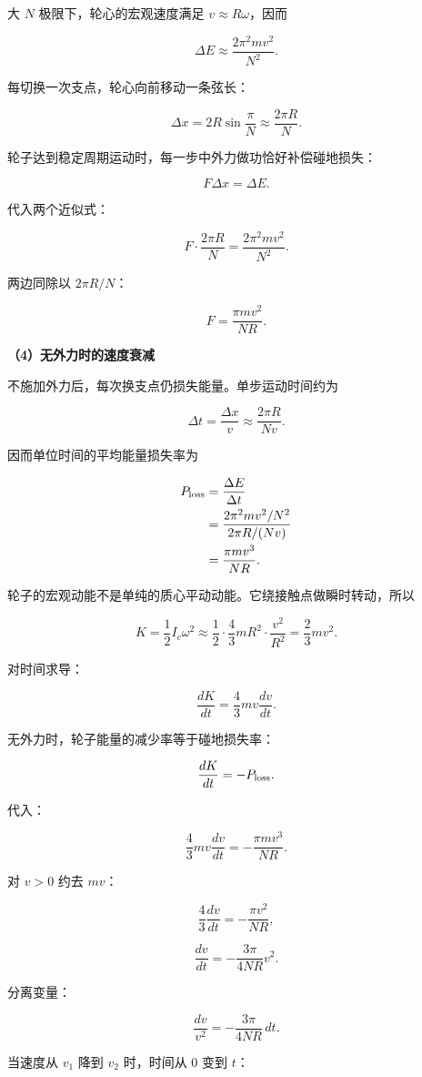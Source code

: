 \documentclass[12pt,a4paper,UTF8]{ctexart}
\begin{document}
大 \(N\) 极限下，轮心的宏观速度满足 \(v\approx R\omega\)，因而

\[\Delta E\approx\frac{2\pi^2mv^2}{N^2}.\]

每切换一次支点，轮心向前移动一条弦长：

\[\Delta x=2R\sin\frac\pi N\approx\frac{2\pi R}{N}.\]

轮子达到稳定周期运动时，每一步中外力做功恰好补偿碰地损失：

\[F\Delta x=\Delta E.\]

代入两个近似式：

\[F\cdot\frac{2\pi R}{N}
=\frac{2\pi^2mv^2}{N^2}.\]

两边同除以 \(2\pi R/N\)：

\[\boxed{F=\frac{\pi mv^2}{NR}}.\]

\textbf{（4）无外力时的速度衰减}

不施加外力后，每次换支点仍损失能量。单步运动时间约为

\[\Delta t=\frac{\Delta x}{v}
\approx\frac{2\pi R}{Nv}.\]

因而单位时间的平均能量损失率为

\[\begin{aligned}
P_{\rm loss}
&=\frac{\Delta E}{\Delta t}\\
&=\frac{2\pi^2mv^2/N^2}{2\pi R/(Nv)}\\
&=\frac{\pi mv^3}{NR}.
\end{aligned}\]

轮子的宏观动能不是单纯的质心平动动能。它绕接触点做瞬时转动，所以

\[K=\frac12I_c\omega^2
\approx\frac12\cdot\frac43mR^2\cdot\frac{v^2}{R^2}
=\frac23mv^2.\]

对时间求导：

\[\frac{dK}{dt}=\frac43mv\frac{dv}{dt}.\]

无外力时，轮子能量的减少率等于碰地损失率：

\[\frac{dK}{dt}=-P_{\rm loss}.\]

代入：

\[\frac43mv\frac{dv}{dt}
=-\frac{\pi mv^3}{NR}.\]

对 \(v>0\) 约去 \(mv\)：

\[\frac43\frac{dv}{dt}=-\frac{\pi v^2}{NR},\]

\[\frac{dv}{dt}=-\frac{3\pi}{4NR}v^2.\]

分离变量：

\[\frac{dv}{v^2}=-\frac{3\pi}{4NR}\,dt.\]

当速度从 \(v_1\) 降到 \(v_2\) 时，时间从 \(0\) 变到 \(t\)：
\end{document}
